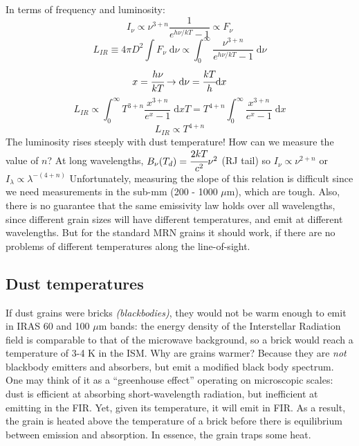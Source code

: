 \documentclass[11pt]{article}
\newcommand{\mar}[1]{\hspace{0pt}\marginpar{-\textcolor{black}{#1}-}}
\newcommand{\mynotes}[1]{{\fontfamily{cmss}\selectfont \textit{#1}}}
\begin{document}
In terms of frequency and luminosity:
\[
    I_{\nu} \propto \nu^{3+n} \frac{1}{ e^{h\nu/kT} - 1 }
    \propto F_{\nu}
    \]
\[
    L_{IR} \equiv 4{\pi}D^{2} \int{ F_{\nu}\; \mathrm{d}\nu }
    \propto \int_{0}^{\infty}{
        \frac{\nu^{3+n}}{ e^{h\nu/kT} - 1 }\; \mathrm{d}\nu }
    \]
\[
x = \cfrac{h\nu}{kT} \rightarrow \mathrm{d}\nu =
\cfrac{kT}{h} \mathrm{d}x
    \]
\[
    L_{IR}
    \propto \int_{0}^{\infty}{
        T^{3+n} \frac{x^{3+n}}{e^{x}-1}\; \mathrm{d}x T}
    = T^{4+n} \int_{0}^{\infty}{
        \frac{x^{3+n}}{e^{x}-1}\; \mathrm{d}x}
    \]
\[
    \boxed{ L_{IR} \propto T^{4+n} }
    \]
The luminosity rises steeply with dust temperature!
\mar{109}How can we measure the value of $n$?
At long wavelengths, $B_{\nu}(T_{d}) = \cfrac{2kT}{c^{2}} \nu^{2} $
(RJ tail) so $ I_{\nu} \propto \nu^{2+n} $ or
$ I_{\lambda} \propto \lambda^{-(4+n)} $
Unfortunately, measuring the slope of this relation is difficult since we need
measurements in the sub-mm (200 - 1000 $\mu$m), which are tough.
Also, there is no guarantee that the same emissivity law holds over all
wavelengths, since different grain sizes will have different temperatures,
and emit at different wavelengths. But for the standard MRN grains
it should work, if there are no problems of different temperatures
along the line-of-sight.

\newpage
\subsection{Dust temperatures}
If dust grains were bricks \mynotes{(blackbodies)}, they would not
be warm enough to emit in IRAS 60 and 100 $\mu$m bands: the energy
density of the Interstellar Radiation field is comparable to that
of the microwave background, so a brick would reach a temperature of
3-4 K in the ISM. Why are grains warmer? Because they are \emph{not}
blackbody emitters and absorbers, but emit a modified black body
spectrum. One may think of it as a ``greenhouse effect''
\mar{110}operating on microscopic scales: dust is efficient at absorbing
short-wavelength radiation, but inefficient at emitting in the FIR.
Yet, given its temperature, it will emit in FIR. As a result, the grain
is heated above the temperature of a brick before there is equilibrium
between emission and absorption. In essence, the grain traps some heat.
\end{document}
